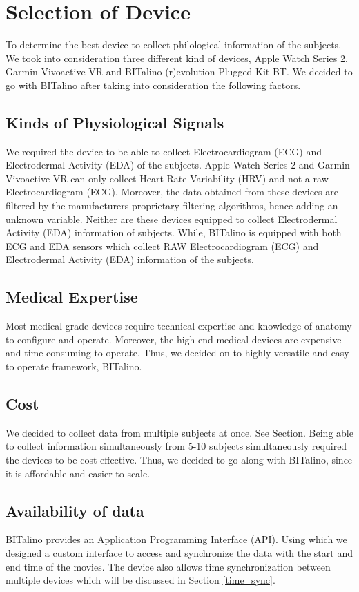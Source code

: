 \section{Selection of Device}
To determine the best device to collect philological information of the subjects. We took into consideration three different kind of devices, Apple Watch Series 2, Garmin Vivoactive VR and BITalino (r)evolution Plugged Kit BT. We decided to go with BITalino after taking into consideration the following factors.
\subsection{Kinds of Physiological Signals}
We required the device to be able to collect Electrocardiogram (ECG) and Electrodermal Activity (EDA) of the subjects. Apple Watch Series 2 and Garmin Vivoactive VR can only collect Heart Rate Variability (HRV) and not a raw Electrocardiogram (ECG). Moreover, the data obtained from these devices are filtered by the manufacturers proprietary filtering algorithms, hence adding an unknown variable. Neither are these devices equipped to collect Electrodermal Activity (EDA) information of subjects. While, BITalino is equipped with both ECG and EDA sensors which collect RAW Electrocardiogram (ECG) and Electrodermal Activity (EDA) information of the subjects.
\subsection{Medical Expertise}
Most medical grade devices require technical expertise and knowledge of anatomy to configure and operate. Moreover, the high-end medical devices are expensive and time consuming to operate. Thus, we decided on to highly versatile and easy to operate framework, BITalino.
\subsection{Cost}
We decided to collect data from multiple subjects at once. See Section. Being able to collect information simultaneously from 5-10 subjects simultaneously required the devices to be cost effective. Thus, we decided to go along with BITalino, since it is affordable and easier to scale.
\subsection{Availability of data}
BITalino provides an Application Programming Interface (API). Using which we designed a custom interface to access and synchronize the data with the start and end time of the movies. The device also allows time synchronization between multiple devices which will be discussed in Section \ref{time_sync}.

